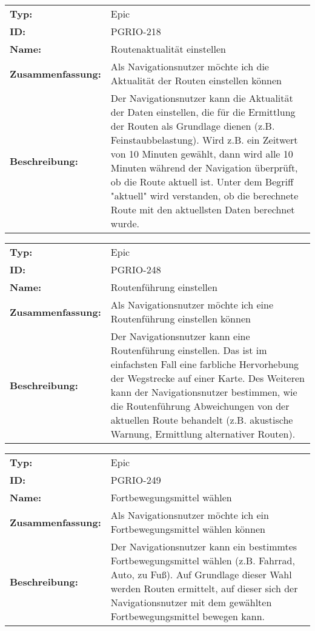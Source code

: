 		\begin{flushleft} 
\begin{tabular}{@{}lp{100mm}} 
\textbf{Typ:} & Epic \\ 
\textbf{ID:} & PGRIO-218 \\ 
\textbf{Name:} & Routenaktualität einstellen \\ 
\textbf{Zusammenfassung:} & Als Navigationsnutzer möchte ich die Aktualität der Routen einstellen können \\ 
\textbf{Beschreibung:} & Der Navigationsnutzer kann die Aktualität der Daten einstellen, die für die Ermittlung der Routen als Grundlage dienen (z.B. Feinstaubbelastung). Wird z.B. ein Zeitwert von 10 Minuten gewählt, dann wird alle 10 Minuten während der Navigation überprüft, ob die Route aktuell ist. Unter dem Begriff "aktuell" wird verstanden, ob die berechnete Route mit den aktuellsten Daten berechnet wurde. \\ 
\end{tabular} 
\end{flushleft} 

		\begin{flushleft} 
\begin{tabular}{@{}lp{100mm}} 
\textbf{Typ:} & Epic \\ 
\textbf{ID:} & PGRIO-248 \\ 
\textbf{Name:} & Routenführung einstellen \\ 
\textbf{Zusammenfassung:} & Als Navigationsnutzer möchte ich eine Routenführung einstellen können \\ 
\textbf{Beschreibung:} & Der Navigationsnutzer kann eine Routenführung einstellen. Das ist im einfachsten Fall eine farbliche Hervorhebung der Wegstrecke auf einer Karte. Des Weiteren kann der Navigationsnutzer bestimmen, wie die Routenführung Abweichungen von der aktuellen Route behandelt (z.B. akustische Warnung, Ermittlung alternativer Routen).    \\ 
\end{tabular} 
\end{flushleft} 

		\begin{flushleft} 
\begin{tabular}{@{}lp{100mm}} 
\textbf{Typ:} & Epic \\ 
\textbf{ID:} & PGRIO-249 \\ 
\textbf{Name:} & Fortbewegungsmittel wählen \\ 
\textbf{Zusammenfassung:} & Als Navigationsnutzer möchte ich ein Fortbewegungsmittel wählen können \\ 
\textbf{Beschreibung:} & Der Navigationsnutzer kann ein bestimmtes Fortbewegungsmittel wählen (z.B. Fahrrad, Auto, zu Fuß). Auf Grundlage dieser Wahl werden Routen ermittelt, auf dieser sich der Navigationsnutzer mit dem gewählten Fortbewegungsmittel bewegen kann. \\ 
\end{tabular} 
\end{flushleft} 

